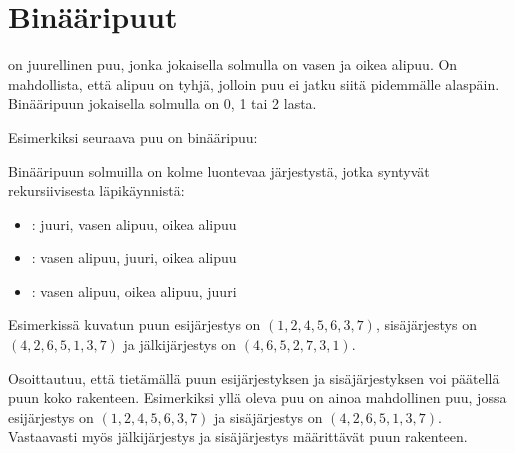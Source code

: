 \section{Binääripuut}


\begin{samepage}
 on juurellinen puu,
jonka jokaisella solmulla on vasen ja oikea alipuu.
On mahdollista, että alipuu on tyhjä,
jolloin puu ei jatku siitä pidemmälle alaspäin.
Binääripuun jokaisella solmulla on 0, 1 tai 2 lasta.

Esimerkiksi seuraava puu on binääripuu:

\begin{center}
\end{center}
\end{samepage}

Binääripuun solmuilla on kolme luontevaa järjestystä,
jotka syntyvät rekursiivisesta läpikäynnistä:


\begin{itemize}
\item {}: juuri, vasen alipuu, oikea alipuu
\item {}: vasen alipuu, juuri, oikea alipuu
\item {}: vasen alipuu, oikea alipuu, juuri
\end{itemize}

Esimerkissä kuvatun puun esijärjestys on
$(1,2,4,5,6,3,7)$,
sisäjärjestys on $(4,2,6,5,1,3,7)$
ja jälkijärjestys on $(4,6,5,2,7,3,1)$.

Osoittautuu, että tietämällä puun esijärjestyksen
ja sisäjärjestyksen voi päätellä puun koko rakenteen.
Esimerkiksi yllä oleva puu on ainoa mahdollinen
puu, jossa esijärjestys on
$(1,2,4,5,6,3,7)$ ja sisäjärjestys on $(4,2,6,5,1,3,7)$.
Vastaavasti myös jälkijärjestys ja sisäjärjestys
määrittävät puun rakenteen.

